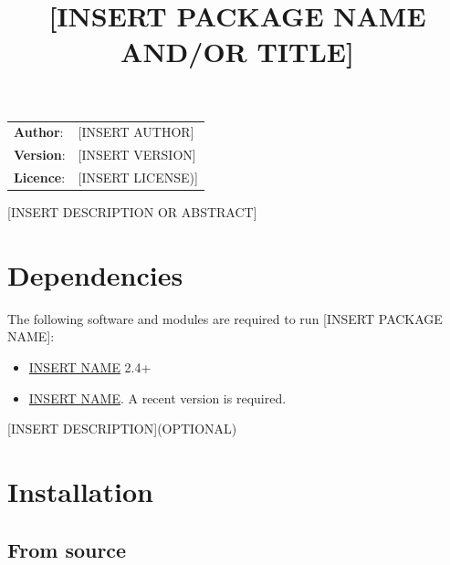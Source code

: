 \documentclass[10pt,a4paper,english]{article}
\title{[INSERT PACKAGE NAME AND/OR TITLE]}
\author{}
\date{}
\newlength{\docinfowidth}
\newlength{\locallinewidth}
\begin{document}
\maketitle
\begin{center}
\begin{tabularx}{\docinfowidth}{lX}
\textbf{Author}: &
	[INSERT AUTHOR] \\
\textbf{Version}: &
	[INSERT VERSION] \\
\textbf{Licence}: &
	[INSERT LICENSE)] \\
\end{tabularx}
\end{center}

\setlength{\locallinewidth}{\linewidth}


[INSERT DESCRIPTION OR ABSTRACT]



\hypertarget{SUBTITLE-1}{}
\section*{Dependencies}
\label{dependencies}

The following software and modules are required to run [INSERT PACKAGE NAME]:
\begin{itemize}
\item {} 
\href{INSERT URL}{INSERT NAME} 2.4+
\item {} 
\href{INSERT URL}{INSERT NAME}. A recent version is required.
\end{itemize}

[INSERT DESCRIPTION](OPTIONAL)




\hypertarget{installation}{}
\section*{Installation}
\label{installation}



\hypertarget{from-source}{}
\subsection*{From source}
\label{from-source}
\end{document}
